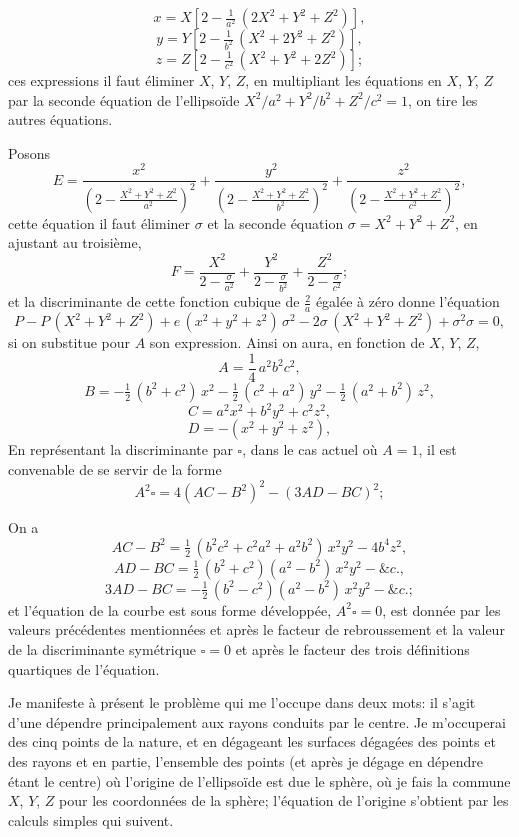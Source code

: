 \documentclass[11pt,a4paper]{book}
\begin{document}
\[
x = X\left[2-\tfrac{1}{a^2}\,(2X^2+Y^2+Z^2)\right],
\]
\[
y = Y\left[2-\tfrac{1}{b^2}\,(X^2+2Y^2+Z^2)\right],
\]
\[
z = Z\left[2-\tfrac{1}{c^2}\,(X^2+Y^2+2Z^2)\right];
\]
ces expressions il faut éliminer $X$, $Y$, $Z$, en multipliant les équations en $X$, $Y$, $Z$ par la seconde équation de l'ellipsoïde $X^2/a^2 + Y^2/b^2 + Z^2/c^2 = 1$, on tire les autres équations.

Posons
\[
E = \frac{x^2}{\left(2-\frac{X^2+Y^2+Z^2}{a^2}\right)^2} + \frac{y^2}{\left(2-\frac{X^2+Y^2+Z^2}{b^2}\right)^2} + \frac{z^2}{\left(2-\frac{X^2+Y^2+Z^2}{c^2}\right)^2},
\]
cette équation il faut éliminer $\sigma$ et la seconde équation $\sigma = X^2+Y^2+Z^2$, en ajustant au troisième,
\[
F = \frac{X^2}{2-\frac{\sigma}{a^2}} + \frac{Y^2}{2-\frac{\sigma}{b^2}} + \frac{Z^2}{2-\frac{\sigma}{c^2}};
\]
et la discriminante de cette fonction cubique de $\frac{2}{a}$ égalée à zéro donne l'équation
\[
P - P\,(X^2+Y^2+Z^2) + e\,(x^2+y^2+z^2)\,\sigma^2 - 2\sigma\,(X^2+Y^2+Z^2) + \sigma^2 \sigma = 0,
\]
si on substitue pour $A$ son expression. Ainsi on aura, en fonction de $X$, $Y$, $Z$,
\[
A = \frac{1}{4}\,a^2b^2c^2,
\]
\[
B = -\tfrac{1}{2}\,(b^2 + c^2)\,x^2 - \tfrac{1}{2}\,(c^2 + a^2)\,y^2 - \tfrac{1}{2}\,(a^2 + b^2)\,z^2,
\]
\[
C = a^2x^2 + b^2y^2 + c^2z^2,
\]
\[
D = -(x^2 + y^2 + z^2),
\]
En représentant la discriminante par $\square$, dans le cas actuel où $A = 1$, il est convenable de se servir de la forme
\[
A^2\square = 4(AC - B^2)^2 - (3AD - BC)^2;
\]

\setcounter{page}{127}

On a
\[
AC - B^2 = \tfrac{1}{2}\,(b^2c^2 + c^2a^2 + a^2b^2)\,x^2y^2 - 4b^4z^2,
\]
\[
AD - BC = \tfrac{1}{2}\,(b^2 + c^2)(a^2 - b^2)\,x^2y^2 - \&c.,
\]
\[
3AD - BC = -\tfrac{1}{2}\,(b^2 - c^2)(a^2 - b^2)\,x^2y^2 - \&c.;
\]
et l'équation de la courbe est sous forme développée, ${A^2\square = 0}$, est donnée par les valeurs précédentes mentionnées et après le facteur de rebroussement et la valeur de la discriminante symétrique $\square = 0$ et après le facteur des trois définitions quartiques de l'équation.

Je manifeste à présent le problème qui me l'occupe dans deux mots: il s'agit d'une dépendre principalement aux rayons conduits par le centre. Je m'occuperai des cinq points de la nature, et en dégageant les surfaces dégagées des points et des rayons et en partie, l'ensemble des points (et après je dégage en dépendre étant le centre) où l'origine de l'ellipsoïde est due le sphère, où je fais la commune $X$, $Y$, $Z$ pour les coordonnées de la sphère; l'équation de l'origine s'obtient par les calculs simples qui suivent.
\end{document}
